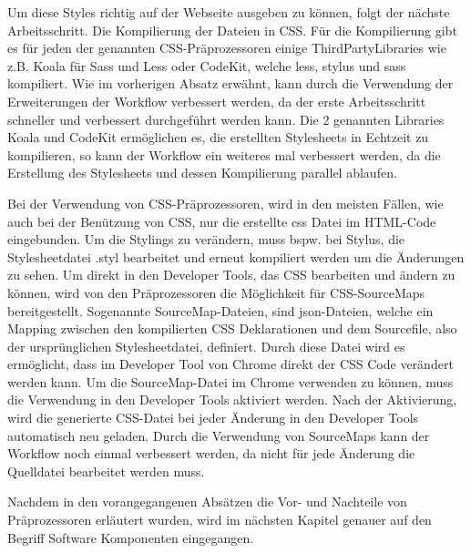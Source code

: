 Um diese Styles richtig auf der Webseite ausgeben zu können, folgt der nächste Arbeitsschritt. Die Kompilierung der Dateien in CSS.\newline
Für die Kompilierung gibt es für jeden der genannten CSS-Präprozessoren einige ThirdPartyLibraries wie z.B. Koala für Sass und Less oder CodeKit, welche less, stylus und sass kompiliert. \newline
Wie im vorherigen Absatz erwähnt, kann durch die Verwendung der Erweiterungen der Workflow verbessert werden, da der erste Arbeitsschritt schneller und verbessert durchgeführt werden kann. \newline
Die 2 genannten Libraries Koala und CodeKit ermöglichen es, die erstellten Stylesheets in Echtzeit zu kompilieren, so kann der Workflow ein weiteres mal verbessert werden, da die Erstellung des Stylesheets und dessen Kompilierung parallel ablaufen.\newline

Bei der Verwendung von CSS-Präprozessoren, wird in den meisten Fällen, wie auch bei der Benützung von CSS, nur die erstellte css Datei im HTML-Code eingebunden. Um die Stylings zu verändern, muss bspw. bei Stylus, die Stylesheetdatei .styl bearbeitet und erneut kompiliert werden um die Änderungen zu sehen. \newline
Um direkt in den Developer Tools, das CSS bearbeiten und ändern zu können, wird von den Präprozessoren die Möglichkeit für CSS-SourceMaps bereitgestellt. Sogenannte SourceMap-Dateien, sind json-Dateien, welche ein Mapping zwischen den kompilierten CSS Deklarationen und dem Sourcefile, also der ursprünglichen Stylesheetdatei, definiert. Durch diese Datei wird es ermöglicht, dass im Developer Tool von Chrome direkt der CSS Code verändert werden kann. Um die SourceMap-Datei im Chrome verwenden zu können, muss die Verwendung in den Developer Tools aktiviert werden. Nach der Aktivierung, wird die generierte CSS-Datei bei jeder Änderung in den Developer Tools automatisch neu geladen.\newline
Durch die Verwendung von SourceMaps kann der Workflow noch einmal verbessert werden, da nicht für jede Änderung die Quelldatei bearbeitet werden muss.\autocite[]{developer.2013}

Nachdem in den vorangegangenen Absätzen die Vor- und Nachteile von Präprozessoren erläutert wurden, wird im nächsten Kapitel genauer auf den Begriff  \glqq{}Software Komponenten\grqq{} eingegangen.
\newpage
